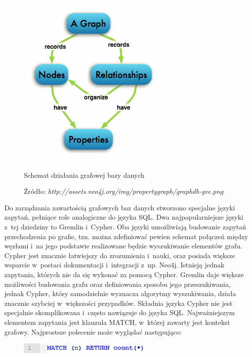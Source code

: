 \begin{figure}[H]
	\centering
	\includegraphics[scale=1]{images/graphdb.png}
	\caption{Schemat działania grafowej bazy danych}
	 \caption*{\small Źródło: \emph{http://assets.neo4j.org/img/propertygraph/graphdb-gve.png}}
	\label{fig:dbschema}
\end{figure}

Do zarządzania zawartością grafowych baz danych stworzono specjalne języki zapytań, pełniące role analogiczne do języka SQL.
Dwa najpopularniejsze języki z~tej dziedziny to Gremlin i~Cypher. Oba języki umożliwiają budowanie zapytań przechodzenia po grafie, tzn. można zdefiniować pewien schemat połączeń między węzłami i~na jego podstawie realizowane będzie wyszukiwanie elementów grafu. Cypher jest znacznie łatwiejszy do zrozumienia i~nauki, oraz posiada większe wsparcie w~postaci dokumentacji i~integracji z~np. Neo4j. Istnieją jednak zapytania, których nie da się wykonać za pomocą Cypher. Gremlin daje większe możliwości budowania grafu oraz definiowania sposobu jego przeszukiwania, jednak Cypher, który samodzielnie wyznacza algorytmy wyszukiwania, działa znacznie szybciej w~większości przypadków. Składnia języka Cypher nie jest specjalnie skomplikowana i~często nawiązuje do języka SQL. Najważniejszym elementem zapytania jest klauzula MATCH, w~której zawarty jest kontekst grafowy. Najprostsze polecenie może wyglądać następująco:

\begin{figure}[H]
	\centering
	\includegraphics{images/cypher_q1.png}
\end{figure}


